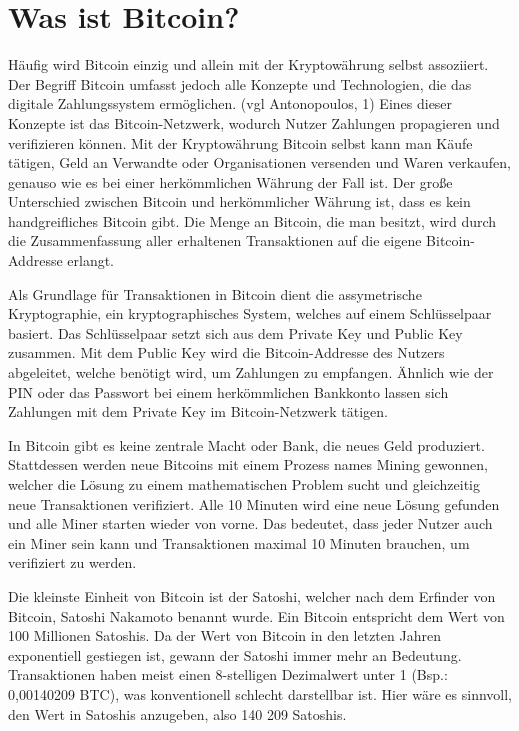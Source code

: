 \section{Was ist Bitcoin?}
Häufig wird Bitcoin einzig und allein mit der Kryptowährung selbst assoziiert. Der Begriff Bitcoin umfasst jedoch alle 
Konzepte und Technologien, die das digitale Zahlungssystem ermöglichen. (vgl Antonopoulos, 1) Eines dieser Konzepte ist das Bitcoin-Netzwerk, wodurch
Nutzer Zahlungen propagieren und verifizieren können. Mit der Kryptowährung Bitcoin selbst kann man Käufe tätigen, Geld an 
Verwandte oder Organisationen versenden und Waren verkaufen, genauso wie es bei einer herkömmlichen Währung der Fall ist. Der 
große Unterschied zwischen Bitcoin und herkömmlicher Währung ist, dass es kein handgreifliches Bitcoin gibt. Die Menge an 
Bitcoin, die man besitzt, wird durch die Zusammenfassung aller erhaltenen Transaktionen auf die eigene Bitcoin-Addresse erlangt. 

Als Grundlage für Transaktionen in Bitcoin dient die assymetrische Kryptographie, ein kryptographisches System, welches auf
einem Schlüsselpaar basiert. Das Schlüsselpaar setzt sich aus dem Private Key und Public Key zusammen. Mit dem Public Key wird
die Bitcoin-Addresse des Nutzers abgeleitet, welche benötigt wird, um Zahlungen zu empfangen. Ähnlich wie der PIN oder das 
Passwort bei einem herkömmlichen Bankkonto lassen sich Zahlungen mit dem Private Key im Bitcoin-Netzwerk tätigen.

In Bitcoin gibt es keine zentrale Macht oder Bank, die neues Geld produziert. Stattdessen werden neue Bitcoins mit einem Prozess
names Mining gewonnen, welcher die Lösung zu einem mathematischen Problem sucht und gleichzeitig neue Transaktionen verifiziert.
Alle 10 Minuten wird eine neue Lösung gefunden und alle Miner starten wieder von vorne. Das bedeutet, dass jeder Nutzer auch ein
Miner sein kann und Transaktionen maximal 10 Minuten brauchen, um verifiziert zu werden.

Die kleinste Einheit von Bitcoin ist der Satoshi, welcher nach dem Erfinder von Bitcoin, Satoshi Nakamoto benannt wurde. Ein 
Bitcoin entspricht dem Wert von 100 Millionen Satoshis. Da der Wert von Bitcoin in den letzten Jahren exponentiell gestiegen ist,
gewann der Satoshi immer mehr an Bedeutung. Transaktionen haben meist einen 8-stelligen Dezimalwert unter 1 (Bsp.: 0,00140209 BTC),
was konventionell schlecht darstellbar ist. Hier wäre es sinnvoll, den Wert in Satoshis anzugeben, also 140 209 Satoshis.


